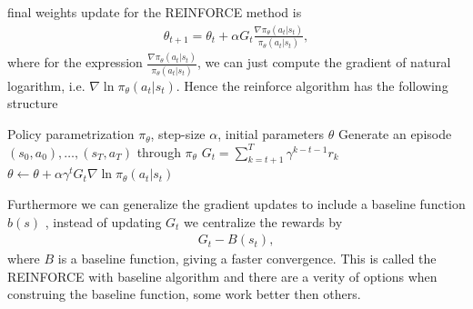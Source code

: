 final weights update for the REINFORCE method is
\begin{align}
    \theta_{t+1} = \theta_t + \alpha G_t
    \frac{\nabla \pi_\theta(a_t|s_t)}{\pi_\theta(a_t|s_t)},
\end{align}
where for the expression $\frac{\nabla
\pi_\theta(a_t|s_t)}{\pi_\theta(a_t|s_t)}$, we can just compute the gradient
of natural logarithm, i.e. $\nabla \ln \pi_\theta(a_t | s_t)$. Hence the
reinforce algorithm has the following structure
\begin{algorithm}
\caption{REINFORCE}\label{alg: reinforce}
    \begin{algorithmic}
        \Require Policy parametrization $\pi_\theta$, step-size $\alpha$,
        initial parameters $\theta$
            \State Generate an episode $(s_0, a_0), \ldots, (s_T, a_T)$
            through $\pi_\theta$
                \State $G_t = \sum_{k=t+1}^T\gamma^{k-t-1}  r_k$
                \State $\theta \gets \theta + \alpha\gamma^{t} G_t
                \nabla\ln\pi_\theta(a_t|s_t)$
            \EndFor
        \EndWhile
    \end{algorithmic}
\end{algorithm}
Furthermore we can generalize the gradient updates to include a baseline
function $b(s)$ \cite[Chapter~13.4]{sutton_barto}, instead of updating $G_t$
we centralize the rewards by
\begin{align}
    G_t - B(s_t),
\end{align}
where $B$ is a baseline function, giving a faster convergence. This is
called the REINFORCE with baseline algorithm and there are a verity of
options when construing the baseline function, some work better then others.
